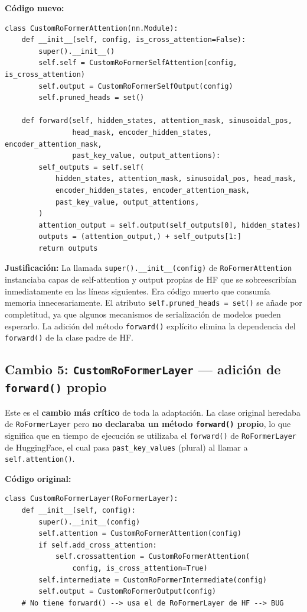 \documentclass[12pt,a4paper]{article}
\begin{document}
\textbf{Código nuevo:}
\begin{lstlisting}[caption={CustomRoFormerAttention corregida (composicion pura)}]
class CustomRoFormerAttention(nn.Module):
    def __init__(self, config, is_cross_attention=False):
        super().__init__()
        self.self = CustomRoFormerSelfAttention(config, is_cross_attention)
        self.output = CustomRoFormerSelfOutput(config)
        self.pruned_heads = set()

    def forward(self, hidden_states, attention_mask, sinusoidal_pos,
                head_mask, encoder_hidden_states, encoder_attention_mask,
                past_key_value, output_attentions):
        self_outputs = self.self(
            hidden_states, attention_mask, sinusoidal_pos, head_mask,
            encoder_hidden_states, encoder_attention_mask,
            past_key_value, output_attentions,
        )
        attention_output = self.output(self_outputs[0], hidden_states)
        outputs = (attention_output,) + self_outputs[1:]
        return outputs
\end{lstlisting}

\begin{notebox}
\textbf{Justificación:} La llamada \texttt{super().\_\_init\_\_(config)} de
\texttt{RoFormerAttention} instanciaba capas de self-attention y output propias de HF
que se sobreescribían inmediatamente en las líneas siguientes. Era código muerto que
consumía memoria innecesariamente. El atributo \texttt{self.pruned\_heads = set()} se
añade por completitud, ya que algunos mecanismos de serialización de modelos pueden
esperarlo. La adición del método \texttt{forward()} explícito elimina la dependencia
del \texttt{forward()} de la clase padre de HF.
\end{notebox}

\subsection{Cambio 5: \texttt{CustomRoFormerLayer} --- adición de \texttt{forward()} propio}

Este es el \textbf{cambio más crítico} de toda la adaptación. La clase original heredaba
de \texttt{RoFormerLayer} pero \textbf{no declaraba un método \texttt{forward()} propio},
lo que significa que en tiempo de ejecución se utilizaba el \texttt{forward()} de
\texttt{RoFormerLayer} de HuggingFace, el cual pasa \texttt{past\_key\_values} (plural)
al llamar a \texttt{self.attention()}.

\textbf{Código original:}
\begin{lstlisting}[caption={CustomRoFormerLayer original (sin forward propio)}]
class CustomRoFormerLayer(RoFormerLayer):
    def __init__(self, config):
        super().__init__(config)
        self.attention = CustomRoFormerAttention(config)
        if self.add_cross_attention:
            self.crossattention = CustomRoFormerAttention(
                config, is_cross_attention=True)
        self.intermediate = CustomRoFormerIntermediate(config)
        self.output = CustomRoFormerOutput(config)
    # No tiene forward() --> usa el de RoFormerLayer de HF --> BUG
\end{lstlisting}
\end{document}

